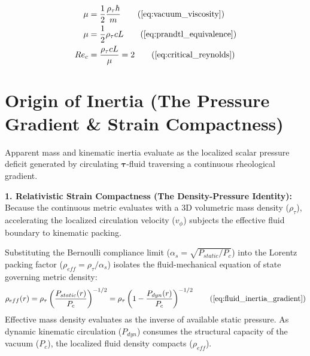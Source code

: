 \documentclass[11pt, a4paper]{article}
\begin{document}
\begin{tcolorbox}[recallbox, title={\ref{box:ns_reg}. Navier-Stokes Regularization}]
\begin{align}
    \mu &= \frac{1}{2} \frac{\rho_{\tau} \hbar}{m} \tag{\ref{eq:vacuum_viscosity}} \\
    \mu &= \frac{1}{2} \rho_{\tau} c L \tag{\ref{eq:prandtl_equivalence}} \\
    Re_c &= \frac{\rho_{\tau} c L}{\mu} = 2 \tag{\ref{eq:critical_reynolds}}
\end{align}
\end{tcolorbox}








\section{Origin of Inertia (The Pressure Gradient \& Strain Compactness)}
\label{sec:deriv_fluid_inertia}

Apparent mass and kinematic inertia evaluate as the localized scalar pressure deficit generated by circulating $\boldsymbol{\tau}$-fluid traversing a continuous rheological gradient.

\textbf{1. Relativistic Strain Compactness (The Density-Pressure Identity):} \\
Because the continuous metric evaluates with a 3D volumetric mass density ($\rho_{\tau}$), accelerating the localized circulation velocity ($v_\phi$) subjects the effective fluid boundary to kinematic packing.

Substituting the Bernoulli compliance limit ($\alpha_s = \sqrt{P_{static}/P_c}$) into the Lorentz packing factor ($\rho_{eff} = \rho_{\tau} / \alpha_s$) isolates the fluid-mechanical equation of state governing metric density:
\begin{equation}
    \rho_{eff}(r) = \rho_{\tau} \left( \frac{P_{static}(r)}{P_c} \right)^{-1/2} = \rho_{\tau} \left( 1 - \frac{P_{dyn}(r)}{P_c} \right)^{-1/2} \tag{\ref{eq:fluid_inertia_gradient}}
\end{equation}
Effective mass density evaluates as the inverse of available static pressure. As dynamic kinematic circulation ($P_{dyn}$) consumes the structural capacity of the vacuum ($P_c$), the localized fluid density compacts ($\rho_{eff}$).
\end{document}
